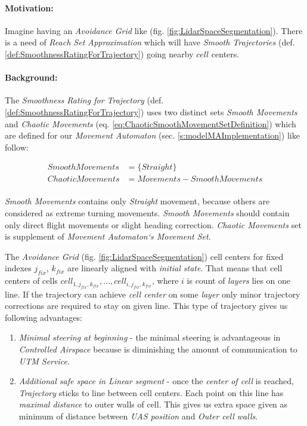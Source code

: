\paragraph{Motivation:} Imagine having an \emph{Avoidance Grid} like (fig. \ref{fig:LidarSpaceSegmentation}). There is a need of \emph{Reach Set Approximation} which will have \emph{Smooth Trajectories} (def. \ref{def:SmoothnessRatingForTrajectory}) going nearby $cell$ centers.

\paragraph{Background:} The \emph{Smoothness Rating for Trajectory} (def. \ref{def:SmoothnessRatingForTrajectory}) uses two distinct sets \emph{Smooth Movements} and \emph{Chaotic Movements} (eq. \ref{eq:ChaoticSmoothMovementSetDefinition}) which are defined for our \emph{Movement Automaton}  (sec. \ref{s:modelMAImplementation}) like follow:

\begin{equation}
    \begin{aligned}
    Smooth Movements &= \{Straight\} \\
    Chaotic Movements &= Movements - Smooth Movements\\
    \end{aligned}
\end{equation}

\emph{Smooth Movements} contains only \emph{Straight} movement, because others are considered as extreme turning movements. \emph{Smooth Movements} should contain only direct flight movements or slight heading correction. \emph{Chaotic Movements} set is supplement of \emph{Movement Automaton`s Movement Set}. 

The \emph{Avoidance Grid} (fig. \ref{fig:LidarSpaceSegmentation}) cell centers for fixed indexes $j_{fix}$, $k_{fix}$ are linearly aligned with \emph{initial state}. That means that  cell centers of cells $cell_{1,j_{fix},k_{fix}},\dots, cell_{i,j_{fix},k_{fix}}$, where $i$ is count of \emph{layers} lies on one line.  If the trajectory can achieve \emph{cell center} on some \emph{layer} only minor trajectory corrections are required to stay on given line. This type of trajectory gives us following advantages:
\begin{enumerate}
    \item\emph{Minimal steering at beginning} - the minimal steering is advantageous in \emph{Controlled Airspace} because is diminishing the amount of communication to \emph{UTM Service}.
    
    \item\emph{Additional safe space in Linear segment} - once the \emph{center of cell} is reached, \emph{Trajectory} sticks to line between cell centers. Each point on this line has \emph{maximal distance} to outer walls of cell. This gives us extra space given as minimum of distance between \emph{UAS position} and \emph{Outer cell walls}.
\end{enumerate}

